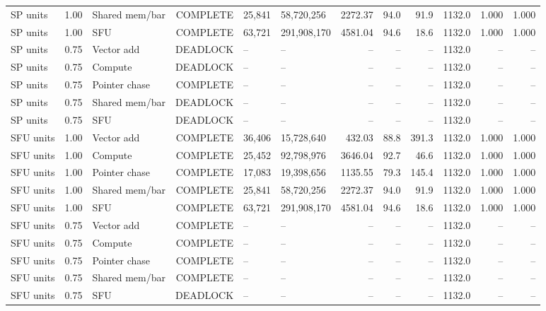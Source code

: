 \begin{landscape}
\begin{scriptsize}
\begin{longtable}{lllrllrrrrrr}
SP units & 1.00 & Shared mem/bar & COMPLETE & 25,841 & 58,720,256 & 2272.37 & 94.0 & 91.9 & 1132.0 & 1.000 & 1.000 \\
SP units & 1.00 & SFU & COMPLETE & 63,721 & 291,908,170 & 4581.04 & 94.6 & 18.6 & 1132.0 & 1.000 & 1.000 \\
SP units & 0.75 & Vector add & DEADLOCK & -- & -- & -- & -- & -- & 1132.0 & -- & -- \\
SP units & 0.75 & Compute & DEADLOCK & -- & -- & -- & -- & -- & 1132.0 & -- & -- \\
SP units & 0.75 & Pointer chase & COMPLETE & -- & -- & -- & -- & -- & 1132.0 & -- & -- \\
SP units & 0.75 & Shared mem/bar & DEADLOCK & -- & -- & -- & -- & -- & 1132.0 & -- & -- \\
SP units & 0.75 & SFU & DEADLOCK & -- & -- & -- & -- & -- & 1132.0 & -- & -- \\
SFU units & 1.00 & Vector add & COMPLETE & 36,406 & 15,728,640 & 432.03 & 88.8 & 391.3 & 1132.0 & 1.000 & 1.000 \\
SFU units & 1.00 & Compute & COMPLETE & 25,452 & 92,798,976 & 3646.04 & 92.7 & 46.6 & 1132.0 & 1.000 & 1.000 \\
SFU units & 1.00 & Pointer chase & COMPLETE & 17,083 & 19,398,656 & 1135.55 & 79.3 & 145.4 & 1132.0 & 1.000 & 1.000 \\
SFU units & 1.00 & Shared mem/bar & COMPLETE & 25,841 & 58,720,256 & 2272.37 & 94.0 & 91.9 & 1132.0 & 1.000 & 1.000 \\
SFU units & 1.00 & SFU & COMPLETE & 63,721 & 291,908,170 & 4581.04 & 94.6 & 18.6 & 1132.0 & 1.000 & 1.000 \\
SFU units & 0.75 & Vector add & COMPLETE & -- & -- & -- & -- & -- & 1132.0 & -- & -- \\
SFU units & 0.75 & Compute & COMPLETE & -- & -- & -- & -- & -- & 1132.0 & -- & -- \\
SFU units & 0.75 & Pointer chase & COMPLETE & -- & -- & -- & -- & -- & 1132.0 & -- & -- \\
SFU units & 0.75 & Shared mem/bar & COMPLETE & -- & -- & -- & -- & -- & 1132.0 & -- & -- \\
SFU units & 0.75 & SFU & DEADLOCK & -- & -- & -- & -- & -- & 1132.0 & -- & -- \\
\end{longtable}
\end{scriptsize}
\end{landscape}